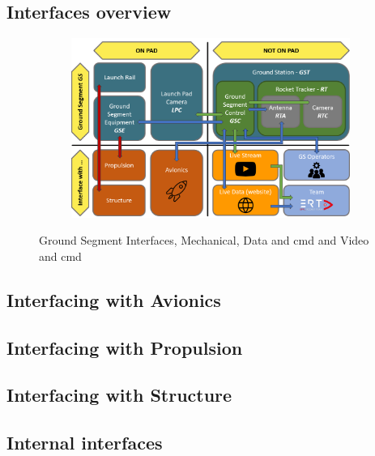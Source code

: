 \subsection{Interfaces overview}


\begin{figure}[h]
    \centering
    \begin{subfigure}{0.6\linewidth}
        \includegraphics[width=\linewidth]{images/interface/subsystem_overall_interface.png} 
    \end{subfigure}
    \label{fig:subsystem_overall_interface}
    \caption{
        Ground Segment Interfaces,
        \textcolor{interface_red}{Mechanical}, %
        \textcolor{interface_blue}{Data and cmd} and %
        \textcolor{interface_green}{Video and cmd} %
    }
\end{figure}


\subsection{Interfacing with Avionics}


\subsection{Interfacing with Propulsion}


\subsection{Interfacing with Structure}


\subsection{Internal interfaces}
